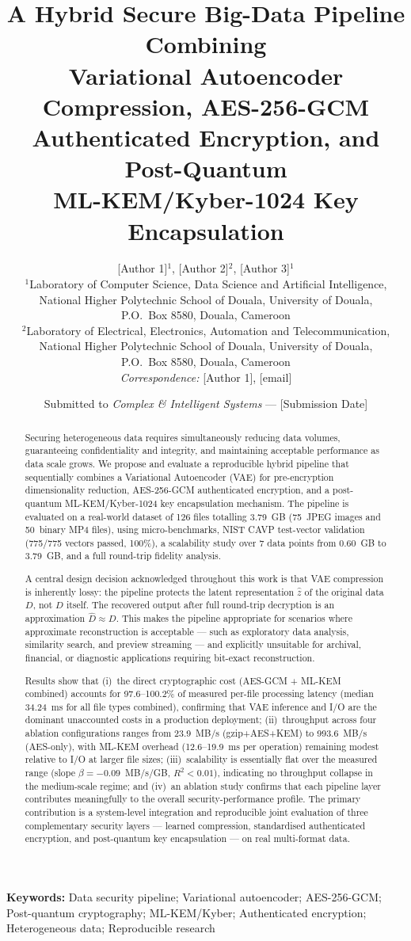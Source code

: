 \documentclass[twocolumn]{article}
\title{\textbf{A Hybrid Secure Big-Data Pipeline Combining\\
Variational Autoencoder Compression, AES-256-GCM\\
Authenticated Encryption, and Post-Quantum\\
ML-KEM/Kyber-1024 Key Encapsulation}}
\author{[Author 1]$^1$, [Author 2]$^2$, [Author 3]$^1$\\[6pt]
$^1$Laboratory of Computer Science, Data Science and Artificial Intelligence,\\
National Higher Polytechnic School of Douala, University of Douala,\\
P.O.\ Box 8580, Douala, Cameroon\\[2pt]
$^2$Laboratory of Electrical, Electronics, Automation and Telecommunication,\\
National Higher Polytechnic School of Douala, University of Douala,\\
P.O.\ Box 8580, Douala, Cameroon\\[4pt]
\textit{Correspondence:} [Author 1], [email]}
\date{Submitted to \textit{Complex \& Intelligent Systems} --- [Submission Date]}
\begin{document}
\maketitle

\noindent\textbf{Keywords:} Data security pipeline; Variational autoencoder; AES-256-GCM;
Post-quantum cryptography; ML-KEM/Kyber; Authenticated encryption;
Heterogeneous data; Reproducible research

\begin{abstract}
Securing heterogeneous data requires simultaneously reducing data volumes,
guaranteeing confidentiality and integrity, and maintaining acceptable performance
as data scale grows. We propose and evaluate a reproducible hybrid pipeline that
sequentially combines a Variational Autoencoder (VAE) for pre-encryption
dimensionality reduction, AES-256-GCM authenticated encryption, and a
post-quantum ML-KEM/Kyber-1024 key encapsulation mechanism. The pipeline is
evaluated on a real-world dataset of 126 files totalling 3.79~GB (75~JPEG images
and 50~binary MP4 files), using micro-benchmarks, NIST CAVP test-vector
validation (775/775 vectors passed, 100\%), a scalability study over 7 data
points from 0.60~GB to 3.79~GB, and a full round-trip fidelity analysis.

A central design decision acknowledged throughout this work is that VAE
compression is inherently lossy: the pipeline protects the latent representation
$\hat{z}$ of the original data $D$, not $D$ itself. The recovered output after
full round-trip decryption is an approximation $\hat{D} \approx D$. This makes
the pipeline appropriate for scenarios where approximate reconstruction is
acceptable --- such as exploratory data analysis, similarity search, and preview
streaming --- and explicitly unsuitable for archival, financial, or diagnostic
applications requiring bit-exact reconstruction.

Results show that (i)~the direct cryptographic cost (AES-GCM + ML-KEM combined)
accounts for 97.6--100.2\% of measured per-file processing latency (median
34.24~ms for all file types combined), confirming that VAE inference and I/O are
the dominant unaccounted costs in a production deployment; (ii)~throughput across
four ablation configurations ranges from 23.9~MB/s (gzip+AES+KEM) to
993.6~MB/s (AES-only), with ML-KEM overhead (12.6--19.9~ms per operation)
remaining modest relative to I/O at larger file sizes; (iii)~scalability is
essentially flat over the measured range (slope $\beta = -0.09$~MB/s/GB,
$R^2 < 0.01$), indicating no throughput collapse in the medium-scale regime; and
(iv)~an ablation study confirms that each pipeline layer contributes meaningfully
to the overall security-performance profile. The primary contribution is a
system-level integration and reproducible joint evaluation of three complementary
security layers --- learned compression, standardised authenticated encryption,
and post-quantum key encapsulation --- on real multi-format data.
\end{abstract}
\end{document}
